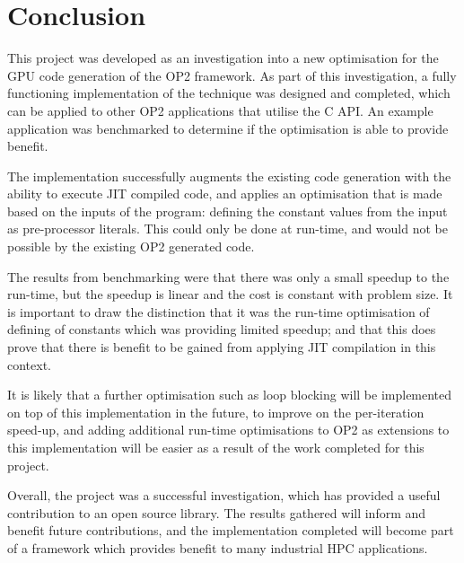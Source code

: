 
\section{Conclusion}
\label{s:conc}

This project was developed as an investigation into a new optimisation for the GPU code generation of the OP2 framework. As part of this investigation, a fully functioning implementation of the technique was designed and completed, which can be applied to other OP2 applications that utilise the C API. An example application was benchmarked to determine if the optimisation is able to provide benefit.
\par
The implementation successfully augments the existing code generation with the ability to execute JIT compiled code, and applies an optimisation that is made based on the inputs of the program: defining the constant values from the input as pre-processor literals. This could only be done at run-time, and would not be possible by the existing OP2 generated code.
\par
The results from benchmarking were that there was only a small speedup to the run-time, but the speedup is linear and the cost is constant with problem size. It is important to draw the distinction that it was the run-time optimisation of defining of constants which was providing limited speedup; and that this does prove that there is benefit to be gained from applying JIT compilation in this context.
\par
It is likely that a further optimisation such as loop blocking will be implemented on top of this implementation in the future, to improve on the per-iteration speed-up, and adding additional run-time optimisations to OP2 as extensions to this implementation will be easier as a result of the work completed for this project.
\par
Overall, the project was a successful investigation, which has provided a useful contribution to an open source library. The results gathered will inform and benefit future contributions, and the implementation completed will become part of a framework which provides benefit to many industrial HPC applications.
